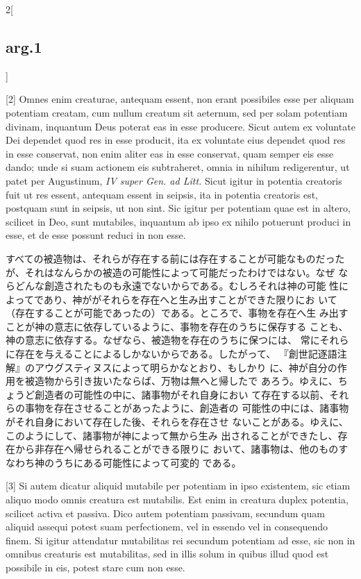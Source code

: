 \documentclass[paper=a4paper,fontsize=10pt,jafontsize=9pt,titlepage]{jlreq}
\begin{document}
\begin{paracol}{2}[\subsection{arg.1}]
\switchcolumn*

[2] Omnes enim creaturae, antequam essent, non erant possibiles esse
per aliquam potentiam creatam, cum nullum creatum sit aeternum, sed
per solam potentiam divinam, inquantum Deus poterat eas in esse
producere. Sicut autem ex voluntate Dei dependet quod res in esse
producit, ita ex voluntate eius dependet quod res in esse conservat,
non enim aliter eas in esse conservat, quam semper eis esse dando;
unde si suam actionem eis subtraheret, omnia in nihilum redigerentur,
ut patet per Augustinum, {\itshape IV super Gen. ad Litt.} Sicut igitur in
potentia creatoris fuit ut res essent, antequam essent in seipsis, ita
in potentia creatoris est, postquam sunt in seipsis, ut non sint. Sic
igitur per potentiam quae est in altero, scilicet in Deo, sunt
mutabiles, inquantum ab ipso ex nihilo potuerunt produci in esse, et
de esse possunt reduci in non esse.

\switchcolumn

すべての被造物は、それらが存在する前には存在することが可能なものだった
 が、それはなんらかの被造の可能性によって可能だったわけではない。なぜ
 ならどんな創造されたものも永遠でないからである。むしろそれは神の可能
 性によってであり、神ががそれらを存在へと生み出すことができた限りにお
 いて（存在することが可能であったの）である。ところで、事物を存在へ生
 み出すことが神の意志に依存しているように、事物を存在のうちに保存する
 ことも、神の意志に依存する。なぜなら、被造物を存在のうちに保つには、
 常にそれらに存在を与えることによるしかないからである。したがって、
 『創世記逐語注解』のアウグスティヌスによって明らかなとおり、もしかり
 に、神が自分の作用を被造物から引き抜いたならば、万物は無へと帰したで
 あろう。ゆえに、ちょうど創造者の可能性の中に、諸事物がそれ自身におい
 て存在する以前、それらの事物を存在させることがあったように、創造者の
 可能性の中には、諸事物がそれ自身において存在した後、それらを存在させ
 ないことがある。ゆえに、このようにして、諸事物が神によって無から生み
 出されることができたし、存在から非存在へ帰せられることができる限りに
 おいて、諸事物は、他のものすなわち神のうちにある可能性によって可変的
 である。

\switchcolumn*

[3] Si autem dicatur aliquid mutabile per potentiam in ipso
existentem, sic etiam aliquo modo omnis creatura est mutabilis.  Est
enim in creatura duplex potentia, scilicet activa et passiva. Dico
autem potentiam passivam, secundum quam aliquid assequi potest suam
perfectionem, vel in essendo vel in consequendo finem. Si igitur
attendatur mutabilitas rei secundum potentiam ad esse, sic non in
omnibus creaturis est mutabilitas, sed in illis solum in quibus illud
quod est possibile in eis, potest stare cum non esse.


\end{paracol}
\end{document}
